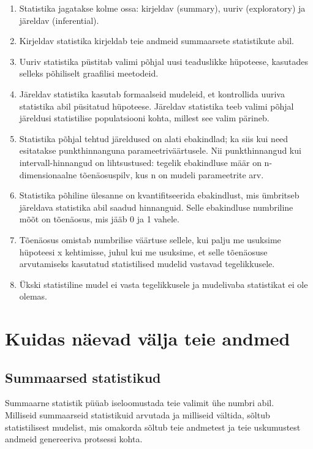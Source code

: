 \documentclass[]{book}
\begin{document}
\begin{enumerate}
\def\labelenumi{\arabic{enumi}.}
\item
  Statistika jagatakse kolme ossa: kirjeldav (summary), uuriv
  (exploratory) ja järeldav (inferential).
\item
  Kirjeldav statistika kirjeldab teie andmeid summaarsete statistikute
  abil.
\item
  Uuriv statistika püstitab valimi põhjal uusi teaduslikke hüpoteese,
  kasutades selleks põhiliselt graafilisi meetodeid.
\item
  Järeldav statistika kasutab formaalseid mudeleid, et kontrollida
  uuriva statistika abil püsitatud hüpoteese. Järeldav statistika teeb
  valimi põhjal järeldusi statistilise populatsiooni kohta, millest see
  valim pärineb.
\item
  Statistika põhjal tehtud järeldused on alati ebakindlad; ka siis kui
  need esitatakse punkthinnanguna parameetriväärtusele. Nii
  punkthinnangud kui intervall-hinnangud on lihtsustused: tegelik
  ebakindluse määr on n-dimensionaalne tõenäosuspilv, kus n on mudeli
  parameetrite arv.
\item
  Statistika põhiline ülesanne on kvantifitseerida ebakindlust, mis
  ümbritseb järeldava statistika abil saadud hinnanguid. Selle
  ebakindluse numbriline mõõt on tõenäosus, mis jääb 0 ja 1 vahele.
\item
  Tõenäosus omistab numbrilise väärtuse sellele, kui palju me usuksime
  hüpoteesi x kehtimisse, juhul kui me usuksime, et selle tõenäosuse
  arvutamiseks kasutatud statistilised mudelid vastavad tegelikkusele.
\item
  Ükski statistiline mudel ei vasta tegelikkusele ja mudelivaba
  statistikat ei ole olemas.
\end{enumerate}

\chapter{Kuidas näevad välja teie
andmed}\label{kuidas-naevad-valja-teie-andmed}

\section*{Summaarsed statistikud}\label{summaarsed-statistikud}

Summaarne statistik püüab iseloomustada teie valimit ühe numbri abil.\\
Milliseid summaarseid statistikuid arvutada ja milliseid vältida, sõltub
statistilisest mudelist, mis omakorda sõltub teie andmetest ja teie
uskumustest andmeid genereeriva protsessi kohta.
\end{document}

